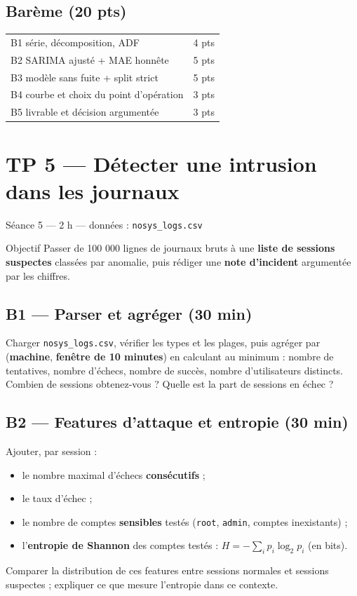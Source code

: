 \documentclass[11pt,a4paper]{article}
\newcommand{\py}[1]{\texttt{\small #1}}
\newcommand{\file}[1]{\texttt{\small #1}}
\begin{document}
\subsection*{Barème (20 pts)}
\begin{center}\small
\begin{tabular}{@{}p{11.2cm}c@{}}
\toprule
B1 série, décomposition, ADF & 4 pts\\
B2 SARIMA ajusté + MAE honnête & 5 pts\\
B3 modèle sans fuite + split strict & 5 pts\\
B4 courbe et choix du point d'opération & 3 pts\\
B5 livrable et décision argumentée & 3 pts\\
\bottomrule
\end{tabular}
\end{center}

\newpage
\section*{TP 5 --- Détecter une intrusion dans les journaux}
{\small\color{grisdoux}Séance 5 --- 2 h --- données : \file{nosys\_logs.csv}}

\begin{obj}{Objectif}
Passer de 100 000 lignes de journaux bruts à une \textbf{liste de sessions
suspectes} classées par anomalie, puis rédiger une \textbf{note d'incident}
argumentée par les chiffres.
\end{obj}

\subsection*{B1 --- Parser et agréger (30 min)}
Charger \file{nosys\_logs.csv}, vérifier les types et les plages, puis agréger
par (\textbf{machine}, \textbf{fenêtre de 10 minutes}) en calculant au minimum :
nombre de tentatives, nombre d'échecs, nombre de succès, nombre d'utilisateurs
distincts. Combien de sessions obtenez-vous ? Quelle est la part de sessions
en échec ?

\subsection*{B2 --- Features d'attaque et entropie (30 min)}
Ajouter, par session :
\begin{itemize}
\item le nombre maximal d'échecs \textbf{consécutifs} ;
\item le taux d'échec ;
\item le nombre de comptes \textbf{sensibles} testés (\py{root}, \py{admin},
comptes inexistants) ;
\item l'\textbf{entropie de Shannon} des comptes testés :
$H = -\sum_i p_i \log_2 p_i$ (en bits).
\end{itemize}
Comparer la distribution de ces features entre sessions normales et sessions
suspectes ; expliquer ce que mesure l'entropie dans ce contexte.
\end{document}
